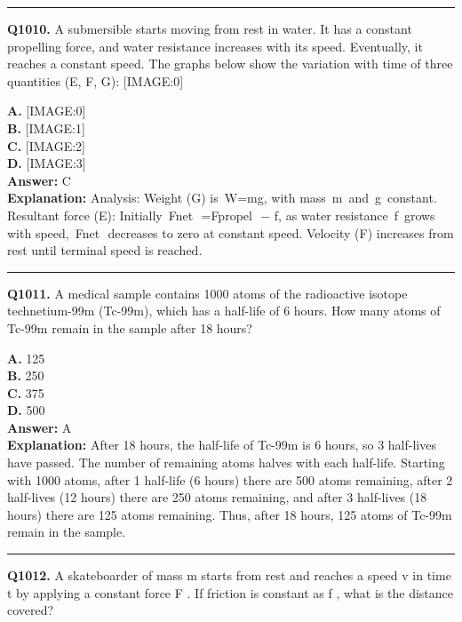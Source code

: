 \documentclass[12pt]{article}
\begin{document}
\hrule
\vspace{1em}


\noindent
\textbf{Q1010.} A submersible starts moving from rest in water. It has a constant propelling force, and water resistance increases with its speed. Eventually, it reaches a constant speed. The graphs below show the variation with time of three quantities (E, F, G):
[IMAGE:0]



\textbf{A.} [IMAGE:0] \\
\textbf{B.} [IMAGE:1] \\
\textbf{C.} [IMAGE:2] \\
\textbf{D.} [IMAGE:3] \\

\textbf{Answer:} C \\
\textbf{Explanation:} Analysis:
Weight (G) is W=mg, with mass m and g constant. Resultant force (E): Initially Fnet
​
=Fpropel
​
−
f, as water resistance f grows with speed, Fnet
​
decreases to zero at constant speed. Velocity (F) increases from rest until terminal speed is reached.

\hrule
\vspace{1em}


\noindent
\textbf{Q1011.} A medical sample contains 1000 atoms of the radioactive isotope technetium-99m (Tc-99m), which has a half-life of 6 hours. How many atoms of Tc-99m remain in the sample after 18 hours?



\textbf{A.} 125 \\
\textbf{B.} 250 \\
\textbf{C.} 375 \\
\textbf{D.} 500 \\

\textbf{Answer:} A \\
\textbf{Explanation:} After 18 hours, the half-life of Tc-99m is 6 hours, so 3 half-lives have passed.
The number of remaining atoms halves with each half-life.
Starting with 1000 atoms, after 1 half-life (6 hours) there are 500 atoms remaining, after 2 half-lives (12 hours) there are 250 atoms remaining, and after 3 half-lives (18 hours) there are 125 atoms remaining.
Thus, after 18 hours, 125 atoms of Tc-99m remain in the sample.

\hrule
\vspace{1em}


\noindent
\textbf{Q1012.} A skateboarder of mass
m
starts from rest and reaches a speed
v
in time
t
by applying a constant force
F
. If friction is constant as
f
, what is the distance covered?
\end{document}
